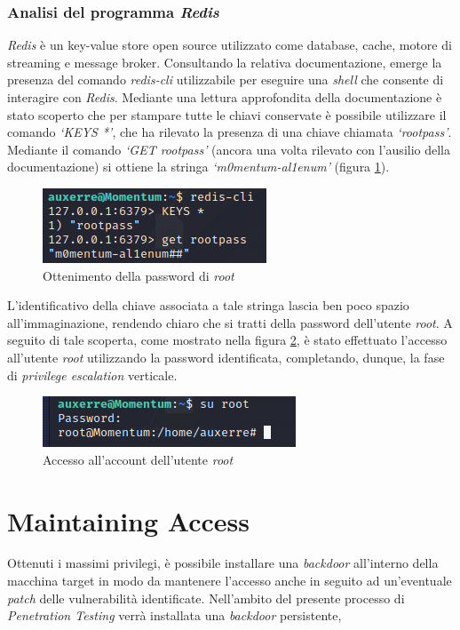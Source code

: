 \subsubsection{Analisi del programma \emph{Redis}}
\emph{Redis} \cite{redis} è un key-value store open source utilizzato come database, cache, motore di streaming e message broker. Consultando la relativa documentazione, emerge la presenza del comando \emph{redis-cli} utilizzabile per eseguire una \emph{shell} che consente di interagire con \emph{Redis}. Mediante una lettura approfondita della documentazione è stato scoperto che per stampare tutte le chiavi conservate è possibile utilizzare il comando \emph{`KEYS *'}, che ha rilevato la presenza di una chiave chiamata \emph{`rootpass'}. Mediante il comando \emph{`GET rootpass'} (ancora una volta rilevato con l'ausilio della documentazione) si ottiene la stringa \emph{`m0mentum-al1enum'} (figura \ref{fig:rediscli}). 
\begin{figure}[h]
    \centering
    \includegraphics[scale=1]{capitoli/images/rediscli.png}
    \caption{Ottenimento della password di \emph{root}}
    \label{fig:rediscli}
\end{figure}

L'identificativo della chiave associata a tale stringa lascia ben poco spazio all'immaginazione, rendendo chiaro che si tratti della password dell'utente \emph{root}. A seguito di tale scoperta, come mostrato nella figura \ref{fig:root}, è stato effettuato l'accesso all'utente \emph{root} utilizzando la password identificata, completando, dunque, la fase di \emph{privilege escalation} verticale.
\begin{figure}[h]
    \centering
    \includegraphics[scale=1]{capitoli/images/root.png}
    \caption{Accesso all'account dell'utente \emph{root}}
    \label{fig:root}
\end{figure}
\section{Maintaining Access}
Ottenuti i massimi privilegi, è possibile installare una \emph{backdoor} all'interno della macchina target in modo da mantenere l'accesso anche in seguito ad un'eventuale \emph{patch} delle vulnerabilità identificate. Nell'ambito del presente processo di \emph{Penetration Testing} verrà installata una \emph{backdoor} persistente, 
\subsection{}